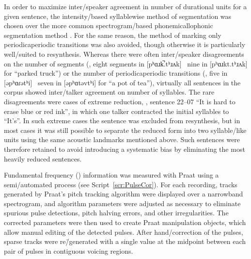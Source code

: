 
In order to maximize inter\-/speaker agreement in number of durational units for a given sentence, the intensity\-/based syllablewise method of segmentation was chosen over the more common spectrogram\-/based phonemic\slsh{}allophonic segmentation method \citep[\eg][]{PetersonLehiste1960, TurkEtAl2006}.  For the same reason, the method of marking only periodic\slsh{}aperiodic transitions was also avoided, though otherwise it is particularly well\-/suited to \psola{} resynthesis.  Whereas there were often inter\-/speaker disagreements on the number of segments (\eg, eight segments in [pʰɑɹk̚.tʰɹʌk] \vs\ nine in [pʰɑɹkt.tʰɹʌk] for “parked truck”) or the number of periodic\slsh{}aperiodic transitions (\eg, five in [əpʰɑɾətʰi] \vs\ seven in [əpʰɑtəvtʰi] for “a pot of tea”), virtually all sentences in the corpus showed inter\-/talker agreement on number of syllables.  The rare disagreements were cases of extreme reduction, \eg, sentence 22–07 “It is hard to erase blue or red ink”, in which one talker contracted the initial syllables to “It’s”.  In such extreme cases the sentence was excluded from resynthesis, but in most cases it was still possible to separate the reduced form into two syllable\-/like units using the same acoustic landmarks mentioned above.  Such sentences were therefore retained to avoid introducing a systematic bias by eliminating the most heavily reduced sentences.

Fundamental frequency (\fo) information was measured with Praat using a semi\-/automated process (see Script~\ref{scr:PulseCor}).  For each recording, \fo{} tracks generated by Praat’s pitch tracking algorithm were displayed over a narrowband spectrogram, and algorithm parameters were adjusted as necessary to eliminate spurious pulse detections, pitch halving errors, and other irregularities.  The corrected parameters were then used to create Praat manipulation objects, which allow manual editing of the detected pulses.  After hand\-/correction of the pulses, sparse \fo{} tracks were re\=/generated with a single value at the midpoint between each pair of pulses in contiguous voicing regions.

